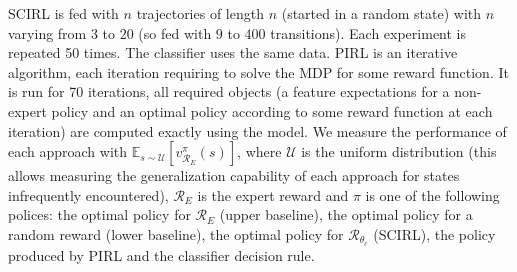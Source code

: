 \documentclass[english,utf8]{./hermes-journal}
\newcommand{\R}{\mathcal{R}}
\newcommand{\E}{\mathbb{E}}
\begin{document}
SCIRL is fed with $n$ trajectories of length $n$ (started in a
random state) with $n$ varying from $3$ to $20$ (so fed with $9$ to
$400$ transitions). Each experiment is repeated 50 times. The
 classifier uses the same data. PIRL is an iterative
algorithm, each iteration requiring to solve the MDP for some reward
function. It is run for 70 iterations, all required objects (a
feature expectations for a non-expert policy and an optimal policy
according to some reward function at each iteration) are computed
exactly using the model. We measure the performance of each approach
with $\E_{s\sim \mathcal{U}}[v^\pi_{\R_E}(s)]$, where $\mathcal{U}$
is the uniform distribution (this allows measuring the
generalization capability of each approach for states infrequently
encountered), $\R_E$ is the expert reward and $\pi$ is one of the
following polices: the optimal policy for $\R_E$ (upper baseline),
the optimal policy for a random reward (lower baseline), the optimal
policy for $\R_{\theta_c}$ (SCIRL), the policy produced by PIRL and
the classifier decision rule.
\end{document}
